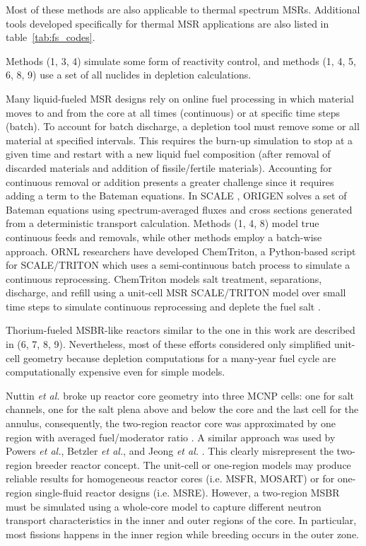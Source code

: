 Most of these methods are also applicable to thermal spectrum \glspl{MSR}. 
Additional tools developed specifically for thermal \gls{MSR} applications are 
also listed in table~\ref{tab:fs_codes}.

Methods (1, 3, 4) simulate some form of reactivity control, and methods (1, 4, 
5, 6, 8, 9) use a set of all nuclides in depletion calculations. 

Many liquid-fueled \gls{MSR} designs rely on online fuel processing in which 
material moves to and from the core at all times (continuous) or at specific 
time steps (batch). To account for batch discharge, a depletion tool must 
remove some or all material at specified intervals. This requires the burn-up 
simulation to stop at a given time and restart with a new liquid fuel 
composition (after removal of discarded materials and addition of 
fissile/fertile materials). Accounting for continuous removal or addition  
presents a greater challenge since it requires adding a term to the Bateman 
equations. In SCALE \cite{bowman_scale_2011}, ORIGEN \cite{gauld_isotopic_2011} 
solves a set of Bateman equations using spectrum-averaged fluxes and cross 
sections generated from a deterministic transport calculation. Methods (1, 4, 
8) model true continuous feeds and removals, while other methods employ a 
batch-wise approach. \gls{ORNL} researchers have developed ChemTriton, a 
Python-based script for SCALE/TRITON which uses a semi-continuous batch process 
to simulate a continuous reprocessing. ChemTriton models salt treatment, 
separations, discharge, and refill using a unit-cell \gls{MSR} SCALE/TRITON 
model over small time steps to simulate continuous reprocessing and deplete the 
fuel salt \cite{powers_new_2013}.

Thorium-fueled \gls{MSBR}-like reactors similar to the one in this work are 
described in (6, 7, 8, 9). Nevertheless, most of these efforts considered only 
simplified unit-cell geometry because depletion computations for a many-year 
fuel cycle are computationally expensive even for simple models. 

Nuttin \emph{et al.} broke up reactor core geometry into three \gls{MCNP} cells: 
one for salt channels, one for the salt plena above and below the core and the 
last cell for the annulus, consequently, the two-region reactor core was 
approximated by one region with averaged fuel/moderator ratio 
\cite{nuttin_potential_2005}.  A similar approach was used by Powers \emph{et 
al.}, Betzler \emph{et al.}, and Jeong \emph{et al.} 
\cite{powers_new_2013,powers_inventory_2014,betzler_modeling_2016, 
betzler_molten_2017, jeong_development_2014, jeong_equilibrium_2016}. This 
clearly misrepresent the two-region breeder reactor concept. The unit-cell or 
one-region models may produce reliable results for homogeneous reactor cores 
(i.e. \gls{MSFR}, \gls{MOSART}) or for one-region single-fluid reactor designs 
(i.e. \gls{MSRE}). However, a two-region \gls{MSBR} must be simulated using a whole-core 
model to capture different neutron transport characteristics in the inner and 
outer regions of the core. In particular, most fissions happens in the inner 
region while breeding occurs in the outer zone.  

